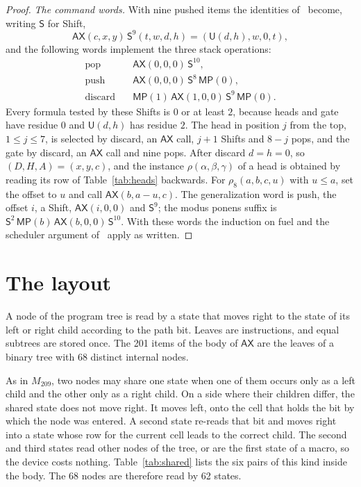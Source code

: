 \documentclass[11pt,letterpaper]{article}
\newcommand{\ax}{\mathsf{AX}}
\newcommand{\mpc}{\mathsf{MP}}
\newcommand{\shift}{\mathsf{S}}
\newcommand{\Uc}{\mathsf{U}}
\begin{document}
\begin{proof}
\emph{The command words.} With nine pushed items the identities
of~\cite[\S6.2]{pa209} become, writing $\shift$ for Shift,
\[
 \ax(c,x,y)\,\shift^{9}(t,w,d,h)=(\Uc(d,h),w,0,t),
\]
and the following words implement the three stack operations:
\[
\begin{aligned}
\text{pop}\quad & \ax(0,0,0)\,\shift^{10},\\
\text{push}\quad & \ax(0,0,0)\,\shift^{8}\,\mpc(0),\\
\text{discard}\quad & \mpc(1)\,\ax(1,0,0)\,\shift^{9}\,\mpc(0).
\end{aligned}
\]
Every formula tested by
these Shifts is $0$ or at least $2$, because heads and gate have
residue $0$ and $\Uc(d,h)$ has residue $2$. The head in position $j$
from the top, $1\le j\le7$, is selected by discard, an $\ax$ call,
$j+1$ Shifts and $8-j$ pops, and the gate by discard, an $\ax$ call
and nine pops. After discard $d=h=0$, so $(D,H,A)=(x,y,c)$, and the
instance $\rho(\alpha,\beta,\gamma)$ of a head is obtained by reading
its row of Table~\ref{tab:heads} backwards. For $\rho_8(a,b,c,u)$
with $u\le a$, set the offset to $u$ and call $\ax(b,a-u,c)$. The
generalization word is push, the offset $i$, a Shift,
$\ax(i,0,0)$ and $\shift^{9}$; the modus ponens suffix is
$\shift^{2}\,\mpc(b)\,\ax(b,0,0)\,\shift^{10}$. With these words the
induction on fuel and the scheduler argument
of~\cite[\S6.2--6.3]{pa209} apply as written.
\end{proof}

\section{The layout}\label{sec:layout}

A node of the program tree is read by a state that moves right to the
state of its left or right child according to the path bit. Leaves are
instructions, and equal subtrees are stored once. The 201 items of the
body of $\ax$ are the leaves of a binary tree with 68 distinct
internal nodes.

As in $M_{209}$, two nodes may share one state when one of them occurs
only as a left child and the other only as a right child. On a side
where their children differ, the shared state does not move right. It
moves left, onto the cell that holds the bit by which the node was
entered. A second state re-reads that bit and moves right into a state
whose row for the current cell leads to the correct child. The second
and third states read other nodes of the tree, or are the first state
of a macro, so the device costs nothing. Table~\ref{tab:shared} lists
the six pairs of this kind inside the body. The 68 nodes are therefore
read by 62 states.
\end{document}
